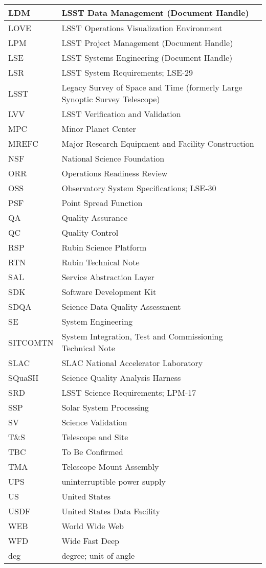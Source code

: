 \begin{longtable}{p{}p{}}
LDM & LSST Data Management (Document Handle) \\\hline
LOVE & LSST Operations Visualization Environment \\\hline
LPM & LSST Project Management (Document Handle) \\\hline
LSE & LSST Systems Engineering (Document Handle) \\\hline
LSR & LSST System Requirements; LSE-29 \\\hline
LSST & Legacy Survey of Space and Time (formerly Large Synoptic Survey Telescope) \\\hline
LVV & LSST Verification and Validation \\\hline
MPC & Minor Planet Center \\\hline
MREFC & Major Research Equipment and Facility Construction \\\hline
NSF & National Science Foundation \\\hline
ORR & Operations Readiness Review \\\hline
OSS & Observatory System Specifications; LSE-30 \\\hline
PSF & Point Spread Function \\\hline
QA & Quality Assurance \\\hline
QC & Quality Control \\\hline
RSP & Rubin Science Platform \\\hline
RTN & Rubin Technical Note \\\hline
SAL & Service Abstraction Layer \\\hline
SDK & Software Development Kit \\\hline
SDQA & Science Data Quality Assessment \\\hline
SE & System Engineering \\\hline
SITCOMTN & System Integration, Test and Commissioning Technical Note \\\hline
SLAC & SLAC National Accelerator Laboratory \\\hline
SQuaSH & Science Quality Analysis Harness \\\hline
SRD & LSST Science Requirements; LPM-17 \\\hline
SSP & Solar System Processing \\\hline
SV & Science Validation \\\hline
T\&S & Telescope and Site \\\hline
TBC & To Be Confirmed \\\hline
TMA & Telescope Mount Assembly \\\hline
UPS & uninterruptible power supply \\\hline
US & United States \\\hline
USDF & United States Data Facility \\\hline
WEB & World Wide Web \\\hline
WFD & Wide Fast Deep \\\hline
deg & degree; unit of angle \\\hline
\end{longtable}
